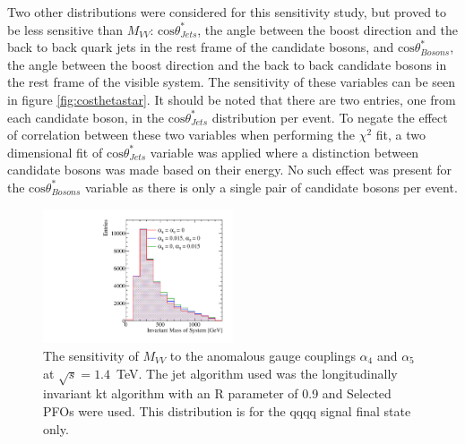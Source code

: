 Two other distributions were considered for this sensitivity study, but proved to be less sensitive than $M_{VV}$: $\text{cos}\theta^{*}_{Jets}$, the angle between the boost direction and the back to back quark jets in the rest frame of the candidate bosons, and $\text{cos}\theta^{*}_{Bosons}$, the angle between the boost direction and the back to back candidate bosons in the rest frame of the visible system.  The sensitivity of these variables can be seen in figure \ref{fig:costhetastar}.  It should be noted that there are two entries, one from each candidate boson, in the $\text{cos}\theta^{*}_{Jets}$ distribution per event.  To negate the effect of correlation between these two variables when performing the $\chi^{2}$ fit, a two dimensional fit of $\text{cos}\theta^{*}_{Jets}$ variable was applied where a distinction between candidate bosons was made based on their energy.  No such effect was present for the $\text{cos}\theta^{*}_{Bosons}$ variable as there is only a single pair of candidate bosons per event.

\begin{figure}[h!]
\centering
\includegraphics[width=0.5\textwidth]{PhysicsAnalysis/Plots/SensitiveDistributions/MVVs_SPFOs_kt_0p90_1400GeV.pdf}
\caption[The sensitivity of $M_{VV}$ to the anomalous gauge couplings $\alpha_{4}$ and $\alpha_{5}$ at $\sqrt{s}=1.4$~TeV.  The jet algorithm used was the longitudinally invariant kt algorithm with an R parameter of 0.9 and Selected PFOs were used.  This distribution is for the \nu{\nu}qqqq signal final state only.]{The sensitivity of $M_{VV}$ to the anomalous gauge couplings $\alpha_{4}$ and $\alpha_{5}$ at $\sqrt{s}=1.4$~TeV.  The jet algorithm used was the longitudinally invariant kt algorithm with an R parameter of 0.9 and Selected PFOs were used.  This distribution is for the \nu{\nu}qqqq signal final state only.}
\label{fig:mvv}
\end{figure}

